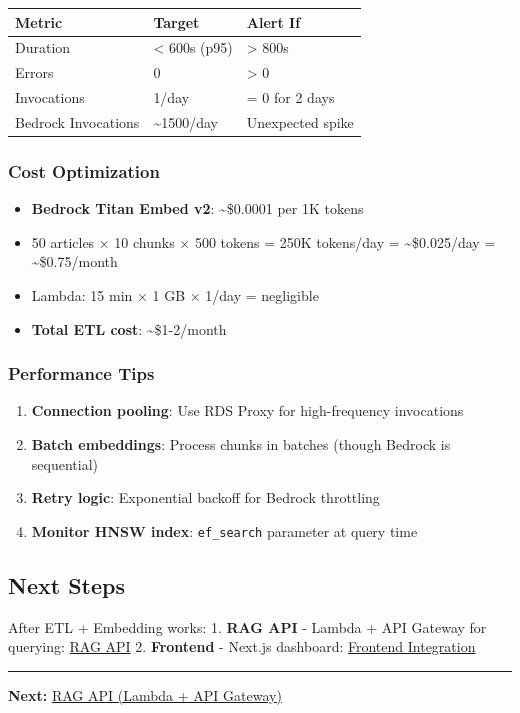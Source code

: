 \begingroup
\small
\setlength{\tabcolsep}{3pt}
\renewcommand{\arraystretch}{1.15}
\begin{longtable}[]{@{}lll@{}}
\toprule\noalign{}
Metric & Target & Alert If \\
\midrule\noalign{}
\endhead
\bottomrule\noalign{}
\endlastfoot
Duration & \textless{} 600s (p95) & \textgreater{} 800s \\
Errors & 0 & \textgreater{} 0 \\
Invocations & 1/day & = 0 for 2 days \\
Bedrock Invocations & \textasciitilde1500/day & Unexpected spike \\
\end{longtable}
\endgroup

\hypertarget{cost-optimization}{%
\subsubsection{Cost Optimization}}

\begin{itemize}
\tightlist
\item
  \textbf{Bedrock Titan Embed v2}: \textasciitilde\$0.0001 per 1K tokens
\item
  50 articles × 10 chunks × 500 tokens = 250K tokens/day =
  \textasciitilde\$0.025/day = \textasciitilde\$0.75/month
\item
  Lambda: 15 min × 1 GB × 1/day = negligible
\item
  \textbf{Total ETL cost}: \textasciitilde\$1-2/month
\end{itemize}

\hypertarget{performance-tips}{%
\subsubsection{Performance Tips}}

\begin{enumerate}
\def\labelenumi{\arabic{enumi}.}
\tightlist
\item
  \textbf{Connection pooling}: Use RDS Proxy for high-frequency
  invocations
\item
  \textbf{Batch embeddings}: Process chunks in batches (though Bedrock
  is sequential)
\item
  \textbf{Retry logic}: Exponential backoff for Bedrock throttling
\item
  \textbf{Monitor HNSW index}: \texttt{ef\_search} parameter at query
  time
\end{enumerate}

\hypertarget{next-steps}{%
\subsection{Next Steps}}

After ETL + Embedding works: 1. \textbf{RAG API} - Lambda + API Gateway
for querying: \href{5.13-RAG-API/}{RAG API} 2. \textbf{Frontend} -
Next.js dashboard: \href{5.14-Frontend/}{Frontend Integration}

\begin{center}\rule{0.5\linewidth}{0.5pt}\end{center}

\textbf{Next:} \href{5.13-RAG-API/}{RAG API (Lambda + API Gateway)}
